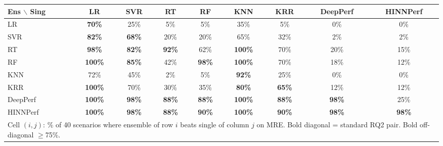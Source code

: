 \begin{tabular}{lcccccccc}
\toprule
Ens $\backslash$ Sing & LR & SVR & RT & RF & KNN & KRR & DeepPerf & HINNPerf \\
\midrule
LR & \textbf{70\%} & 25\% & 5\% & 5\% & 35\% & 5\% & 0\% & 0\% \\
SVR & \textbf{82\%} & \textbf{68\%} & 20\% & 20\% & 65\% & 32\% & 2\% & 2\% \\
RT & \textbf{98\%} & \textbf{82\%} & \textbf{92\%} & 62\% & \textbf{100\%} & 70\% & 20\% & 15\% \\
RF & \textbf{100\%} & \textbf{85\%} & 42\% & \textbf{98\%} & \textbf{100\%} & 70\% & 18\% & 12\% \\
KNN & 72\% & 45\% & 2\% & 5\% & \textbf{92\%} & 25\% & 0\% & 0\% \\
KRR & \textbf{100\%} & 70\% & 30\% & 35\% & \textbf{80\%} & \textbf{65\%} & 12\% & 12\% \\
DeepPerf & \textbf{100\%} & \textbf{98\%} & \textbf{88\%} & \textbf{88\%} & \textbf{100\%} & \textbf{88\%} & \textbf{98\%} & 25\% \\
HINNPerf & \textbf{100\%} & \textbf{98\%} & \textbf{88\%} & \textbf{90\%} & \textbf{100\%} & \textbf{90\%} & \textbf{98\%} & \textbf{98\%} \\
\bottomrule
\multicolumn{9}{l}{\footnotesize Cell $(i,j)$: \% of 40 scenarios where ensemble of row $i$ beats single of column $j$ on MRE. Bold diagonal = standard RQ2 pair. Bold off-diagonal $\geq$75\%.} \\
\end{tabular}
